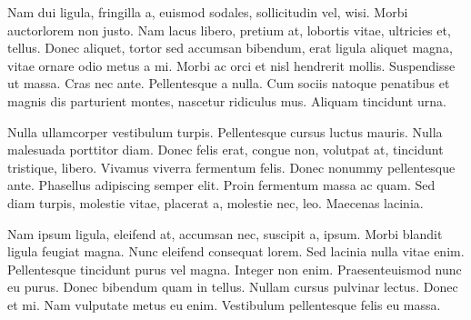 Nam dui ligula, fringilla a, euismod sodales, sollicitudin vel, wisi. Morbi auctorlorem non justo. Nam lacus libero, pretium at, lobortis vitae, ultricies et, tellus. Donec aliquet, tortor sed accumsan bibendum, erat ligula aliquet magna, vitae ornare odio metus a mi. Morbi ac orci et nisl hendrerit mollis. Suspendisse ut massa. Cras nec ante. Pellentesque a nulla. Cum sociis natoque penatibus et magnis dis parturient montes, nascetur ridiculus mus. Aliquam tincidunt urna.

Nulla ullamcorper vestibulum turpis. Pellentesque cursus luctus mauris.
Nulla malesuada porttitor diam. Donec felis erat, congue non, volutpat at,
tincidunt tristique, libero. Vivamus viverra fermentum felis. Donec nonummy
pellentesque ante. Phasellus adipiscing semper elit. Proin fermentum massa ac quam. Sed diam turpis, molestie vitae, placerat a, molestie nec, leo. Maecenas lacinia. 

Nam ipsum ligula, eleifend at, accumsan nec, suscipit a, ipsum. Morbi
blandit ligula feugiat magna. Nunc eleifend consequat lorem. Sed lacinia nulla vitae enim. Pellentesque tincidunt purus vel magna. Integer non enim. Praesenteuismod nunc eu purus. Donec bibendum quam in tellus. Nullam cursus
pulvinar lectus. Donec et mi. Nam vulputate metus eu enim. Vestibulum
pellentesque felis eu massa.